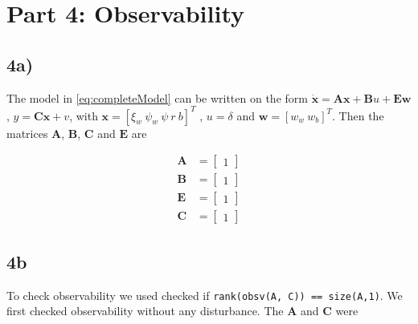 
\section{Part 4: Observability}

\subsection{4a)}

The model in \cref{eq:completeModel} can be written on the form $\mathbf{\dot x} = \mathbf{A} \mathbf{x} + \mathbf{B}u + \mathbf{E}\mathbf{w}$, $ y = \mathbf{C}\mathbf{x} + v$, with $\mathbf{x} = [ \xi_w\ \psi_w\ \psi\ r\ b]^ T $ , $ u = \delta $ and $ \mathbf{w} = [w_w\ w_b]^T$. Then the matrices $\mathbf{A}$, $\mathbf{B}$, $\mathbf{C}$ and $\mathbf{E}$ are

\begin{subequations}
    \begin{align}
        \mathbf{A} &= \begin{bmatrix}
        1
        \end{bmatrix} \\
        \mathbf{B} &= \begin{bmatrix}
        1
        \end{bmatrix} \\
        \mathbf{E} &= \begin{bmatrix}
        1
        \end{bmatrix} \\
        \mathbf{C} &= \begin{bmatrix}
        1
        \end{bmatrix}
    \end{align}
\end{subequations}


\subsection{4b}

To check observability we used checked if \texttt{rank(obsv(A, C)) == size(A,1)}. We first checked observability without any disturbance. The $\mathbf{A}$ and $\mathbf{C}$ were
